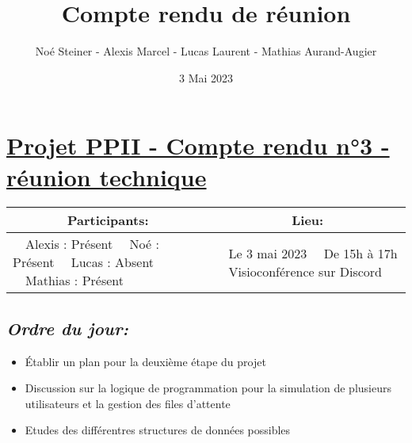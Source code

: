 \documentclass[french,a4paper]{article}
\author{Noé Steiner - Alexis Marcel - Lucas Laurent - Mathias Aurand-Augier}
\date{3 Mai 2023}
\newcommand{\tabitem}{\textbullet~~}\title{Compte rendu de réunion}
\begin{document}
\maketitle

\section*{\underline{Projet PPII - Compte rendu n°3 - réunion technique}}

\begin{table}[!htb]
  \centering
  \begin{tabular}{| p{7cm} | p{7cm} |}
    \hline
    \multicolumn{1}{|c|}{ Participants:} & \multicolumn{1}{c|}{Lieu:} \\
    \hline
    \tabitem Alexis : Présent\newline
    \tabitem Noé : Présent\newline
    \tabitem Lucas : Absent\newline
    \tabitem Mathias : Présent                      &
    \tabitem Le 3 mai 2023\newline
    \tabitem De 15h à 17h\newline
    \tabitem Visioconférence sur Discord                                         \\
    \hline
  \end{tabular}
\end{table}

\subsection*{\textit{Ordre du jour:}}

\begin{itemize}
  \item Établir un plan pour la deuxième étape du projet
  \item Discussion sur la logique de programmation pour la simulation de plusieurs utilisateurs et la gestion des files d'attente
  \item Etudes des différentres structures de données possibles
\end{itemize}
\end{document}
